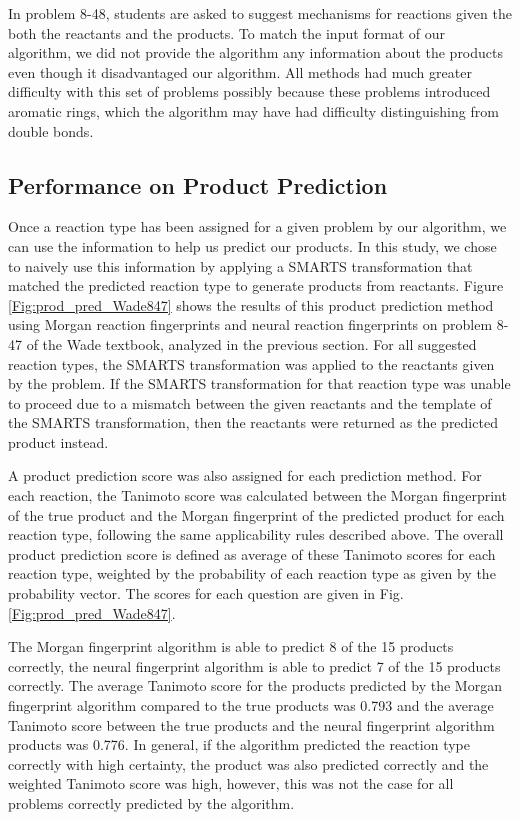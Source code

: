 In problem 8-48, students are asked to suggest mechanisms for reactions given the both the reactants and the products. To match the input format of our algorithm, we did not provide the algorithm any information about the products even though it disadvantaged our algorithm. All methods had much greater difficulty with this set of problems possibly because these problems introduced aromatic rings, which the algorithm may have had difficulty distinguishing from double bonds.

\subsection{Performance on Product Prediction}

Once a reaction type has been assigned for a given problem by our algorithm, we can use the information to help us predict our products. In this study, we chose to naively use this information by applying a SMARTS transformation that matched the predicted reaction type to generate products from reactants. Figure \ref{Fig:prod_pred_Wade847} shows the results of this product prediction method using Morgan reaction fingerprints and neural reaction fingerprints on problem 8-47 of the Wade textbook, analyzed in the previous section. For all suggested reaction types, the SMARTS transformation was applied to the reactants given by the problem. If the SMARTS transformation for that reaction type was unable to proceed due to a mismatch between the given reactants and the template of the SMARTS transformation, then the reactants were returned as the predicted product instead. 

A product prediction score was also assigned for each prediction method. For each reaction, the Tanimoto score\cite{Bajusz_2015} was calculated between the Morgan fingerprint of the true product and the Morgan fingerprint of the predicted product for each reaction type, following the same applicability rules described above. The overall product prediction score is defined as average of these Tanimoto scores for each reaction type, weighted by the probability of each reaction type as given by the probability vector. The scores for each question are given in Fig. \ref{Fig:prod_pred_Wade847}.

The Morgan fingerprint algorithm is able to predict 8 of the 15 products correctly, the neural fingerprint algorithm is able to predict 7 of the 15 products correctly. The average Tanimoto score for the products predicted by the Morgan fingerprint algorithm compared to the true products was 0.793 and the average Tanimoto score between the true products and the neural fingerprint algorithm products was 0.776. In general, if the algorithm predicted the reaction type correctly with high certainty, the product was also predicted correctly and the weighted Tanimoto score was high, however, this was not the case for all problems correctly predicted by the algorithm.

